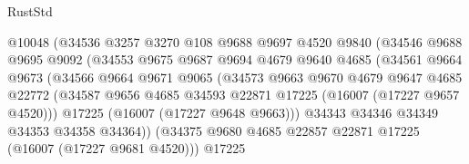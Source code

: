 \begin{lexlean}{RustStd}
\begin{coremodule}
                              @10048
                              (@34536
                                @3257
                                @3270
                                @108
                                @9688
                                @9697
                                @4520
                                @9840
                                (@34546
                                  @9688
                                  @9695
                                  @9092
                                  (@34553
                                    @9675
                                    @9687
                                    @9694
                                    @4679
                                    @9640
                                    @4685
                                    (@34561
                                      @9664
                                      @9673
                                      (@34566
                                        @9664
                                        @9671
                                        @9065
                                        (@34573
                                          @9663
                                          @9670
                                          @4679
                                          @9647
                                          @4685
                                          @22772
                                          (@34587
                                            @9656
                                            @4685
                                            @34593
                                            @22871
                                            @17225
                                            (@16007 (@17227 @9657 @4520)))
                                          @17225
                                          (@16007 (@17227 @9648 @9663)))
                                        @34343
                                        @34346
                                        @34349
                                        @34353
                                        @34358
                                        @34364))
                                    (@34375
                                      @9680
                                      @4685
                                      @22857
                                      @22871
                                      @17225
                                      (@16007 (@17227 @9681 @4520)))
                                    @17225

\end{coremodule}
\end{lexlean}

